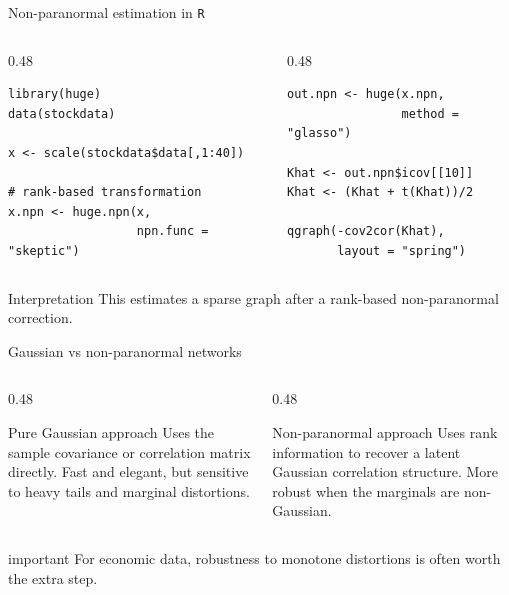 \documentclass[dvipsnames,aspectratio=169,handout]{beamer}
\begin{document}
\begin{frame}[fragile]{Non-paranormal estimation in \texttt{R}}
\begin{columns}[T,onlytextwidth]
\begin{column}{0.48\textwidth}
\begin{lstlisting}
library(huge)
data(stockdata)

x <- scale(stockdata$data[,1:40])

# rank-based transformation
x.npn <- huge.npn(x,
                  npn.func = "skeptic")
\end{lstlisting}
\end{column}
\begin{column}{0.48\textwidth}
\begin{lstlisting}
out.npn <- huge(x.npn,
                method = "glasso")

Khat <- out.npn$icov[[10]]
Khat <- (Khat + t(Khat))/2

qgraph(-cov2cor(Khat),
       layout = "spring")
\end{lstlisting}
\end{column}
\end{columns}

\begin{alertblock}{Interpretation}
This estimates a sparse graph after a rank-based non-paranormal correction.
\end{alertblock}
\end{frame}



\begin{frame}{Gaussian vs non-paranormal networks}
\begin{columns}[T]
\begin{column}{0.48\textwidth}
\begin{block}{Pure Gaussian approach}
Uses the sample covariance or correlation matrix directly.
Fast and elegant, but sensitive to heavy tails and marginal distortions.
\end{block}
\end{column}
\begin{column}{0.48\textwidth}
\begin{block}{Non-paranormal approach}
Uses rank information to recover a latent Gaussian correlation structure.
More robust when the marginals are non-Gaussian.
\end{block}
\end{column}
\end{columns}

\vspace{2mm}
\begin{beamercolorbox}[wd=\textwidth,sep=7pt,center,rounded=true,shadow=true]{important}
For economic data, robustness to monotone distortions is often worth the extra step.
\end{beamercolorbox}
\end{frame}
\end{document}
